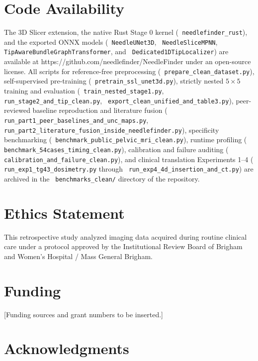 \documentclass[
  11pt,
]{article}
\let\nforigtexttt\texttt
\renewcommand{\texttt}[1]{\nforigtexttt{\XeTeXinterchartokenstate=1 #1}}
\begin{document}
\section*{Code Availability}\label{code-availability}

The 3D Slicer extension, the native Rust Stage 0 kernel
(\texttt{needlefinder\_rust}), and the exported ONNX models
(\texttt{NeedleUNet3D}, \texttt{NeedleSliceMPNN},
\texttt{TipAwareBundleGraphTransformer}, and
\texttt{Dedicated1DTipLocalizer}) are available at
https://github.com/needlefinder/NeedleFinder under an open-source
license. All scripts for reference-free preprocessing
(\texttt{prepare\_clean\_dataset.py}), self-supervised pre-training
(\texttt{pretrain\_ssl\_unet3d.py}), strictly nested \(5 \times 5\)
training and evaluation (\texttt{train\_nested\_stage1.py},
\texttt{run\_stage2\_and\_tip\_clean.py},
\texttt{export\_clean\_unified\_and\_table3.py}), peer-reviewed baseline
reproduction and literature fusion
(\texttt{run\_part1\_peer\_baselines\_and\_unc\_maps.py},
\texttt{run\_part2\_literature\_fusion\_inside\_needlefinder.py}),
specificity benchmarking
(\texttt{benchmark\_public\_pelvic\_mri\_clean.py}), runtime profiling
(\texttt{benchmark\_54cases\_timing\_clean.py}), calibration and failure
auditing (\texttt{calibration\_and\_failure\_clean.py}), and clinical
translation Experiments 1--4 (\texttt{run\_exp1\_tg43\_dosimetry.py}
through \texttt{run\_exp4\_4d\_insertion\_and\_ct.py}) are archived in
the \texttt{benchmarks\_clean/} directory of the repository.

\section*{Ethics Statement}\label{ethics-statement}

This retrospective study analyzed imaging data acquired during routine
clinical care under a protocol approved by the Institutional Review
Board of Brigham and Women's Hospital / Mass General Brigham.

\section*{Funding}\label{funding}

{[}Funding sources and grant numbers to be inserted.{]}

\section*{Acknowledgments}\label{acknowledgments}
\end{document}
